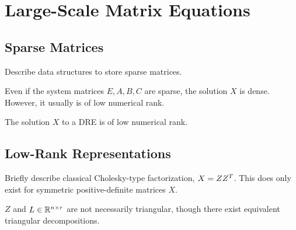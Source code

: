 \chapter{Large-Scale Matrix Equations}

\section{Sparse Matrices}
Describe data structures to store sparse matrices.

Even if the system matrices $E, A, B, C$ are sparse,
the solution $X$ is dense.
However, it usually is of low numerical rank.

\begin{theorem}
\label{thm:lowrank}
The solution $X$ to a \ac{DRE} is of low numerical rank.
\end{theorem}

\section{Low-Rank Representations}

Briefly describe classical Cholesky-type factorization, $X=ZZ^T$.
This does only exist for symmetric positive-definite matrices $X$.


$Z$ and $L \in \mathbb{R}^{n\times r}$ are not necessarily triangular,
though there exist equivalent triangular decompositions.

